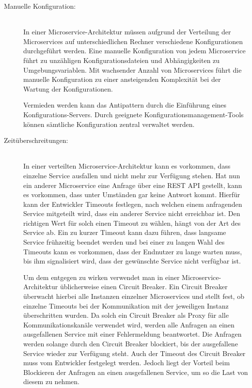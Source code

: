 \begin{description}
    \item[Manuelle Konfiguration:]\hfill \\
    In einer Microservice-Architektur müssen aufgrund der Verteilung der Microservices auf unterschiedlichen Rechner verschiedene Konfigurationen durchgeführt werden. Eine manuelle Konfiguration von jedem Microservice führt zu unzähligen Konfigurationsdateien und Abhängigkeiten zu Umgebungsvariablen. Mit wachsender Anzahl von Microservices führt die manuelle Konfiguration zu einer ansteigenden Komplexität bei der Wartung der Konfigurationen.

    Vermieden werden kann das Antipattern durch die Einführung eines Konfigurations-Servers. Durch geeignete Konfigurationsmanagement-Tools können sämtliche Konfiguration zentral verwaltet werden.
    
    \item[Zeitüberschreitungen:]\hfill \\
    In einer verteilten Microservice-Architektur kann es vorkommen, dass einzelne Service ausfallen und nicht mehr zur Verfügung stehen. Hat nun ein anderer Microservice eine Anfrage über eine REST API gestellt, kann es vorkommen, dass unter Umständen gar keine Antwort kommt. Hierfür kann der Entwickler Timeouts festlegen, nach welchen einem anfragenden Service mitgeteilt wird, dass ein anderer Service nicht erreichbar ist. Den richtigen Wert für solch einen Timeout zu wählen, hängt von der Art des Service ab. Ein zu kurzer Timeout kann dazu führen, dass langsame Service frühzeitig beendet werden und bei einer zu langen Wahl des Timeouts kann es vorkommen, dass der Endnutzer zu lange warten muss, bis ihm signalisiert wird, dass der gewünschte Service nicht verfügbar ist.

    Um dem entgegen zu wirken verwendet man in einer Microservice-Architektur üblicherweise einen Circuit Breaker. Ein Circuit Breaker überwacht hierbei alle Instanzen einzelner Microservices und stellt fest, ob einzelne Timeouts bei der Kommunikation mit der jeweiligen Instanz überschritten wurden. Da solch ein Circuit Breaker als Proxy für alle Kommunikationskanäle verwendet wird, werden alle Anfragen an einen ausgefallenen Service mit einer Fehlermeldung beantwortet. Die Anfragen werden solange durch den Circuit Breaker blockiert, bis der ausgefallene Service wieder zur Verfügung steht. Auch der Timeout des Circuit Breaker muss vom Entwickler festgelegt werden. Jedoch liegt der Vorteil beim Blockieren der Anfragen an einen ausgefallenen Service, um so die Last von diesem zu nehmen.

\end{description}

